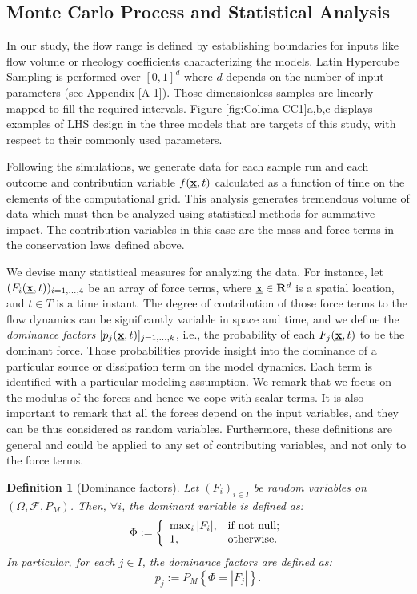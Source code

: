 \documentclass{article}
\newtheorem{definition}[theorem]{Definition}
\begin{document}
\subsection{Monte Carlo Process and Statistical Analysis}
In our study, the flow range is defined by establishing boundaries for inputs like flow volume or rheology coefficients characterizing the models.  Latin Hypercube Sampling is performed over $[0,1]^d$ where $d$ depends on the number of  input parameters (see Appendix \ref{A-1}). Those dimensionless samples are linearly  mapped to fill the required intervals. Figure \ref{fig:Colima-CC1}a,b,c displays examples of LHS design in the three models that are targets of this study, with respect to their commonly used parameters.

Following the simulations, we generate data for each sample run and each outcome and contribution variable $f(\underline{\textbf x},t)$ calculated as a function of time on the elements of the computational grid. This analysis generates tremendous volume of data which must then be analyzed using statistical methods for summative impact. The contribution variables in this case are the mass and force terms in the conservation laws defined above.

We devise many statistical measures for analyzing the data. For instance, let $(F_i(\underline{\textbf x},t))_{i=1,\dots, 4}$ be an array of force terms, where $\underline{\textbf x}\in \mathbf R^d$ is a spatial location, and $t\in T$ is a time instant. The degree of contribution of those force terms to the flow dynamics can be significantly variable in space and time, and we define the \emph{dominance factors} $[p_j(\underline{\textbf x},t)]_{j=1,\dots, k}$, i.e., the probability of each $F_j(\underline{\textbf x},t)$ to be the dominant force. Those probabilities provide insight into the dominance of a particular source or dissipation term on the model dynamics. Each term is identified with a particular modeling assumption. We remark that we focus on the modulus of the forces and hence we cope with scalar terms. It is also important to remark that all the forces depend on the input variables, and they can be thus considered as random variables. Furthermore, these definitions are general and could be applied to any set of contributing variables, and not only to the force terms.

\begin{definition}[Dominance factors]
Let $(F_i)_{i\in I}$ be random variables on $(\Omega, \mathcal F, P_M)$. Then, $\forall i$, the dominant variable is defined as:
$$\Phi:=\left\{
    \begin{array}{ll}
      \max_i |F_i|, & \hbox{if not null;} \\
      1, & \hbox{otherwise.}
    \end{array}
  \right.$$
In particular, for each $j \in I$, the dominance factors are defined as:
$$p_j:=P_M\left\{\Phi=|F_j|\right\}.$$
\end{definition}
\end{document}
